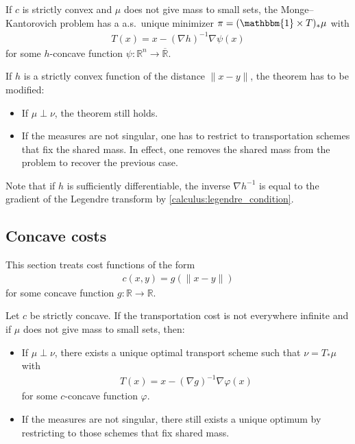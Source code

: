     \begin{theorem}
        If $c$ is strictly convex and $\mu$ does not give mass to small sets, the Monge--Kantorovich problem has a a.s.~unique minimizer $\pi = (\mathbbm{1}\times T)_\ast\mu$ with
        \begin{gather}
            T(x) = x - (\nabla h)^{-1}\nabla\psi(x)
        \end{gather}
        for some $h$-concave function $\psi:\mathbb{R}^n\rightarrow\overline{\mathbb{R}}$.
    \end{theorem}
    \begin{remark}
        If $h$ is a strictly convex function of the distance $\|x-y\|$, the theorem has to be modified:
        \begin{itemize}
            \item If $\mu\perp\nu$, the theorem still holds.
            \item If the measures are not singular, one has to restrict to transportation schemes that fix the shared mass. In effect, one removes the shared mass from the problem to recover the previous case.
        \end{itemize}
    \end{remark}
    Note that if $h$ is sufficiently differentiable, the inverse $\nabla h^{-1}$ is equal to the gradient of the Legendre transform by \cref{calculus:legendre_condition}.

\subsection{Concave costs}

    This section treats cost functions of the form
    \begin{gather}
        c(x,y) = g(\|x-y\|)
    \end{gather}
    for some concave function $g:\mathbb{R}\rightarrow\mathbb{R}$.

    \begin{property}
        Let $c$ be strictly concave. If the transportation cost is not everywhere infinite and if $\mu$ does not give mass to small sets, then:
        \begin{itemize}
            \item If $\mu\perp\nu$, there exists a unique optimal transport scheme such that $\nu = T_\ast\mu$ with
            \begin{gather}
                T(x) = x - (\nabla g)^{-1}\nabla\varphi(x)
            \end{gather}
            for some $c$-concave function $\varphi$.
            \item If the measures are not singular, there still exists a unique optimum by restricting to those schemes that fix shared mass.
        \end{itemize}
    \end{property}

